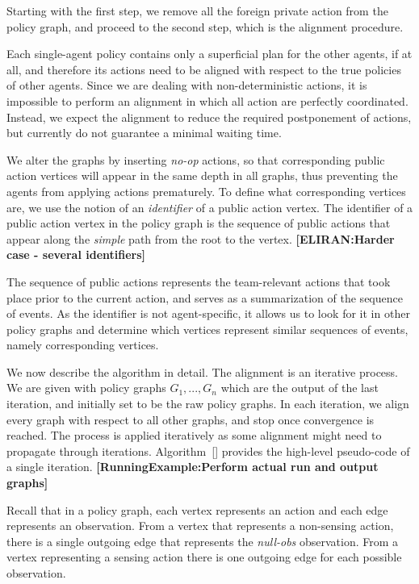 \documentclass[letterpaper]{article} %
\newcommand{\eliran}[1]{\textbf{[\color{red}ELIRAN:#1]}}
\newcommand{\RE}[1]{\textbf{[\color{purple}RunningExample:#1]}}
\begin{document}
Starting with the first step, we remove all the foreign private action from the policy graph, and proceed to the second step, which is the alignment procedure.

Each single-agent policy contains only a superficial plan for the other agents, if at all, and therefore its actions need to be aligned with respect to the true policies of other agents. 
Since we are dealing with non-deterministic actions, it is impossible to perform an alignment in which all action are perfectly coordinated.
Instead, we expect the alignment to reduce the required postponement of actions, but currently do not guarantee a minimal waiting time.

We alter the graphs by inserting \emph{no-op} actions, so that corresponding public action vertices will appear in the same depth in all graphs, thus preventing the agents from applying actions prematurely.
To define what corresponding vertices are, we use the notion of an \emph{identifier} of a public action vertex. The identifier of a public action vertex in the policy graph is the
sequence of public actions that appear along the \emph{simple} path from the root to the vertex.
\eliran{Harder case - several identifiers}

The sequence of public actions represents the team-relevant actions that took place prior to the current action, and serves as a summarization of the sequence of events. As the identifier is not agent-specific, it allows us to look for it in other policy graphs and determine which vertices represent similar
sequences of events, namely corresponding vertices.

We now describe the algorithm in detail.
The alignment is an iterative process. We are given with policy graphs $G_1,...,G_n$ which are the output of the last iteration, and initially set to be the raw policy graphs. In each iteration, we align every graph with respect to all other graphs, and stop once convergence is reached. The process is applied iteratively as some alignment might need to propagate through iterations. Algorithm~\ref{} provides the high-level pseudo-code of a single iteration.
\RE{Perform actual run and output graphs}


Recall that in a policy graph, each vertex represents an action and each edge represents an observation. From a vertex that represents a non-sensing action, there is a single outgoing edge that represents the \emph{null-obs} observation. From a vertex representing a sensing action there is one outgoing edge for each possible observation.
\end{document}
